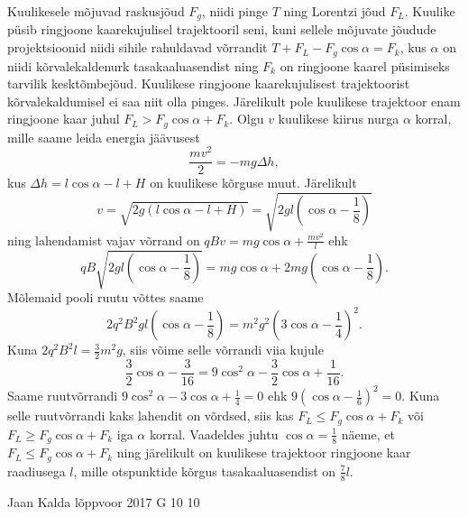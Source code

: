 \documentclass[11pt, twoside]{article}
\begin{document}
{{\ifSolution
Kuulikesele mõjuvad raskusjõud $F_g$, niidi pinge $T$ ning Lorentzi jõud $F_L$. Kuulike püsib ringjoone kaarekujulisel trajektooril seni, kuni sellele mõjuvate jõudude projektsioonid niidi sihile rahuldavad võrrandit $T+F_L-F_g\cos\alpha=F_k$, kus $\alpha$ on niidi kõrvalekaldenurk tasakaaluasendist ning $F_k$ on ringjoone kaarel püsimiseks tarvilik kesktõmbejõud. Kuulikese ringjoone kaarekujulisest trajektoorist kõrvalekaldumisel ei saa niit olla pinges. Järelikult pole kuulikese trajektoor enam ringjoone kaar juhul $F_L>F_g\cos\alpha+F_k$. Olgu $v$ kuulikese kiirus nurga $\alpha$ korral, mille saame leida energia jäävusest 
\[
\frac{mv^2}{2}=-mg\Delta h,
\]
kus $\Delta h=l\cos\alpha-l+H$ on kuulikese kõrguse muut. Järelikult 
\[
v=\sqrt{2g\left(l\cos\alpha-l+H\right)}=\sqrt{2gl\left(\cos\alpha-\frac{1}{8}\right)}
\]
ning lahendamist vajav võrrand on $qBv=mg\cos\alpha+\frac{mv^2}{l}$ ehk 
\[
qB\sqrt{2gl\left(\cos\alpha-\frac{1}{8}\right)}=mg\cos\alpha+2mg\left(\cos\alpha-\frac{1}{8}\right).
\]
Mõlemaid pooli ruutu võttes saame
\[
2q^2B^2gl\left(\cos\alpha-\frac{1}{8}\right)=m^2g^2\left(3\cos\alpha-\frac{1}{4}\right)^2.
\] 
Kuna $2q^2B^2l=\frac{3}{2}m^2g$, siis võime selle võrrandi viia kujule 
\[
\frac{3}{2}\cos\alpha-\frac{3}{16}=9\cos^2\alpha-\frac{3}{2}\cos\alpha+\frac{1}{16}.
\]
Saame ruutvõrrandi $9\cos^2\alpha-3\cos\alpha+\frac{1}{4}=0$ ehk $9\left(\cos\alpha-\frac{1}{6}\right)^2=0$. Kuna selle ruutvõrrandi kaks lahendit on võrdsed, siis kas $F_L\leq F_g\cos\alpha+F_k$ või $F_L\geq F_g\cos\alpha+F_k$ iga $\alpha$ korral. Vaadeldes juhtu $\cos\alpha=\frac{1}{8}$ näeme, et $F_L\leq F_g\cos\alpha+F_k$ ning järelikult on kuulikese trajektoor ringjoone kaar raadiusega $l$, mille otspunktide kõrgus tasakaaluasendist on $\frac{7}{8}l$.
\fi
}

{Jaan Kalda} %
{lõppvoor} %
{2017} %
{G 10} %
{10} %
{

}}
\end{document}

